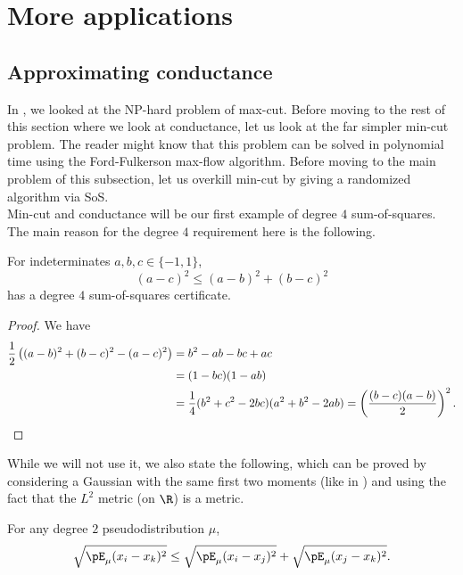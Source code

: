 
\clearpage

\section{More applications}

\subsection{Approximating conductance}

	In , we looked at the \textsf{NP}-hard problem of max-cut. Before moving to the rest of this section where we look at conductance, let us look at the far simpler min-cut problem. The reader might know that this problem can be solved in polynomial time using the Ford-Fulkerson max-flow algorithm. Before moving to the main problem of this subsection, let us overkill min-cut by giving a randomized algorithm via SoS.\\
	Min-cut and conductance will be our first example of degree $4$ sum-of-squares. The main reason for the degree $4$ requirement here is the following.

	\begin{ftheo}
		For indeterminates $a,b,c \in \{-1,1\}$,
		\[ (a-c)^2 \le (a-b)^2 + (b-c)^2 \]
		has a degree $4$ sum-of-squares certificate.
	\end{ftheo}
	\begin{proof}
		We have
		\begin{align*}
			\frac{1}{2}\left((a-b)^2 + (b-c)^2 - (a-c)^2\right) &= b^2 - ab - bc + ac \\
				&= (1-bc)(1-ab) \\
				&= \frac{1}{4} (b^2+c^2-2bc)(a^2+b^2-2ab) = \left(\frac{(b-c)(a-b)}{2}\right)^2. \qedhere
		\end{align*}
	\end{proof}

	While we will not use it, we also state the following, which can be proved by considering a Gaussian with the same first two moments (like in ) and using the fact that the $L^2$ metric (on $\R$) is a metric.

	\begin{theorem}
		For any degree $2$ pseudodistribution $\mu$,
		\[ \sqrt{\pE_\mu (x_i - x_k)^2} \le \sqrt{\pE_\mu (x_i - x_j)^2} + \sqrt{\pE_\mu (x_j - x_k)^2}. \]
	\end{theorem}

